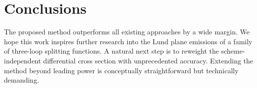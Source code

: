 \section{Conclusions}\label{sec:conclusions}

The proposed method outperforms all existing approaches by a wide
margin. We hope this work inspires further research into the Lund plane
emissions of a family of three-loop splitting functions. A natural next
step is to reweight the scheme-independent differential cross section
with unprecedented accuracy. Extending the method beyond leading power
is conceptually straightforward but technically demanding.

